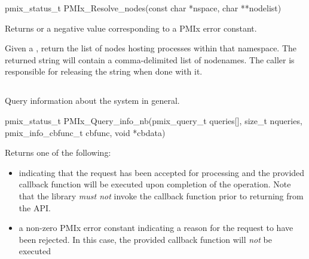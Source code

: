 \cspecificstart
\begin{codepar}
pmix_status_t
PMIx_Resolve_nodes(const char *nspace, char **nodelist)
\end{codepar}
\cspecificend

\begin{arglist}
\end{arglist}

Returns  or a negative value corresponding to a PMIx error constant.

\descr

Given a , return the list of nodes hosting processes within that namespace.
The returned string will contain a comma-delimited list of nodenames.
The caller is responsible for releasing the string when done with it.


\subsection{}

\summary

Query information about the system in general.

\format

\cspecificstart
\begin{codepar}
pmix_status_t
PMIx_Query_info_nb(pmix_query_t queries[], size_t nqueries,
                   pmix_info_cbfunc_t cbfunc, void *cbdata)
\end{codepar}
\cspecificend

\begin{arglist}
\end{arglist}

Returns one of the following:

\begin{itemize}
\item {} indicating that the request has been accepted for processing and the provided callback function will be executed upon completion of the operation. Note that the library \emph{must not} invoke the callback function prior to returning from the \ac{API}.
\item a non-zero \ac{PMIx} error constant indicating a reason for the request to have been rejected. In this case, the provided callback function will \emph{not} be executed
\end{itemize}

